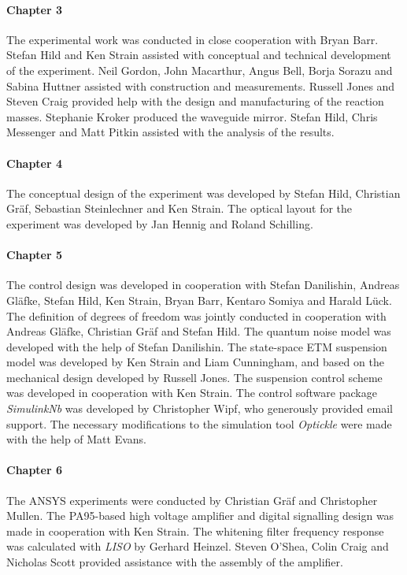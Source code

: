 \paragraph{Chapter 3}
The experimental work was conducted in close cooperation with Bryan Barr. Stefan Hild and Ken Strain assisted with conceptual and technical development of the experiment. Neil Gordon, John Macarthur, Angus Bell, Borja Sorazu and Sabina Huttner assisted with construction and measurements. Russell Jones and Steven Craig provided help with the design and manufacturing of the reaction masses. Stephanie Kroker produced the waveguide mirror. Stefan Hild, Chris Messenger and Matt Pitkin assisted with the analysis of the results.

\paragraph{Chapter 4}
The conceptual design of the experiment was developed by Stefan Hild, Christian Gr\"{a}f, Sebastian Steinlechner and Ken Strain. The optical layout for the experiment was developed by Jan Hennig and Roland Schilling.

\paragraph{Chapter 5}
The control design was developed in cooperation with Stefan Danilishin, Andreas Gl\"{a}fke, Stefan Hild, Ken Strain, Bryan Barr, Kentaro Somiya and Harald L\"{u}ck. The definition of degrees of freedom was jointly conducted in cooperation with Andreas Gl\"{a}fke, Christian Gr\"{a}f and Stefan Hild. The quantum noise model was developed with the help of Stefan Danilishin. The state-space ETM suspension model was developed by Ken Strain and Liam Cunningham, and based on the mechanical design developed by Russell Jones. The suspension control scheme was developed in cooperation with Ken Strain. The control software package \emph{SimulinkNb} was developed by Christopher Wipf, who generously provided email support. The necessary modifications to the simulation tool \emph{Optickle} were made with the help of Matt Evans.

\paragraph{Chapter 6}
The ANSYS experiments were conducted by Christian Gr\"{a}f and Christopher Mullen. The PA95-based high voltage amplifier and digital signalling design was made in cooperation with Ken Strain. The whitening filter frequency response was calculated with \emph{LISO} by Gerhard Heinzel. Steven O'Shea, Colin Craig and Nicholas Scott provided assistance with the assembly of the amplifier.


